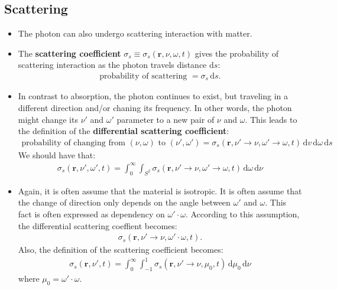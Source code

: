 \documentclass[10pt]{article}
\newcommand{\dee}{\mathrm{d}}
\newcommand{\ve}[1]{\mathbf{#1}}
\newcommand{\ra}{\rightarrow}
\begin{document}
  \subsection{Scattering}
  \begin{itemize}
    \item The photon can also undergo scattering interaction with matter.

    \item The \textbf{scattering coefficient} $\sigma_s \equiv \sigma_s(\ve{r}, \nu, \omega, t)$ gives the probability of scattering interaction as the photon travels distance $\dee s$:
    \begin{align*}
      \mbox{probability of scattering } = \sigma_s\, \dee s.
    \end{align*}

    \item In contrast to absorption, the photon continues to exist, but traveling in a different direction and/or chaning its frequency. In other words, the photon might change its $\nu'$ and $\omega'$ parameter to a new pair of $\nu$ and $\omega$. This leads to the definition of the \textbf{differential scattering coefficient}:
    \begin{align*}
      \mbox{probability of changing from $(\nu,\omega)$ to $(\nu',\omega')$} = \sigma_s(\ve{r}, \nu' \ra \nu, \omega' \ra \omega, t)\, \dee v\, \dee \omega \, \dee s
    \end{align*}
    We should have that:
    \begin{align*}
      \sigma_s(\ve{r}, \nu', \omega', t) = \int_{0}^\infty \int_{S^2} \sigma_s(\ve{r}, \nu' \ra \nu, \omega' \ra \omega, t)\, \dee \omega \, \dee \nu
    \end{align*}

    \item Again, it is often assume that the material is isotropic. It is often assume that the change of direction only depends on the angle between $\omega'$ and $\omega$. This fact is often expressed as dependency on $\omega' \cdot \omega$. According to this assumption, the differential scattering coeffient becomes:
    \begin{align*}
      \sigma_s(\ve{r}, \nu' \ra \nu, \omega' \cdot \omega, t).
    \end{align*}
    Also, the definition of the scattering coefficient becomes:
    \begin{align*}
      \sigma_s(\ve{r}, \nu', t) = \int_{0}^\infty \int_{-1}^1 \sigma_s(\ve{r}, \nu' \ra \nu, \mu_0, t)\, \dee \mu_0 \, \dee \nu
    \end{align*}
    where $\mu_0 = \omega' \cdot \omega$.


\end{itemize}
\end{document}
